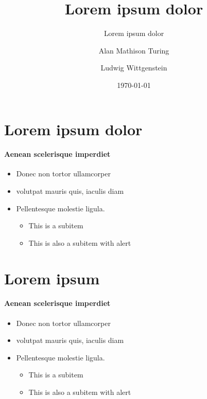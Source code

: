 \documentclass{beamer}
\title{Lorem ipsum dolor}
\subtitle{Lorem ipsum dolor}
\author{Alan Mathison Turing \inst{1} \and Ludwig Wittgenstein \inst{2}}
\institute{\inst{1} Princeton University, \inst{2} Cambridge University} %
\date{\today}      %
\begin{document}
\maketitle

\makeoutline

\section{Lorem ipsum dolor}

\begin{frame}{\secname}
\framesubtitle{Aenean scelerisque imperdiet}
\begin{itemize}
	\item Donec non tortor ullamcorper
	\item volutpat mauris quis, iaculis diam
	\item Pellentesque molestie ligula.
	\begin{itemize}
		\item This is a subitem 
		\item This is also a subitem with \alert{alert} 
	\end{itemize}
\end{itemize}

\end{frame}

\section{Lorem ipsum}

\begin{frame}{\secname}
\framesubtitle{Aenean scelerisque imperdiet}
\begin{itemize}
	\item Donec non tortor ullamcorper
	\item volutpat mauris quis, iaculis diam
	\item Pellentesque molestie ligula.
	\begin{itemize}
		\item This is a subitem 
		\item This is also a subitem with \alert{alert} 
	\end{itemize}
\end{itemize}

\end{frame}




\end{document}
